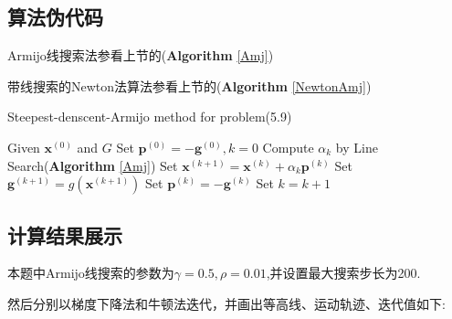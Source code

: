 \subsection{算法伪代码}
Armijo线搜索法参看上节的(\textbf{Algorithm} \ref{Amj})

带线搜索的Newton法算法参看上节的(\textbf{Algorithm} \ref{NewtonAmj})

\begin{algorithm}[h]  
\caption{Steepest-denscent-Armijo method for problem(5.9)}  
\begin{algorithmic}[1]  
\STATE Given $\bm{x}^{(0)}$ and $G$
\STATE Set $\bm{p}^{(0)}=-\bm{g}^{(0)},k=0$
\STATE Compute $\alpha_k$ by Line Search(\textbf{Algorithm} \ref{Amj})
\STATE Set $\bm{x}^{(k+1)}=\bm{x}^{(k)}+\alpha_k\bm{p}^{(k)}$
\STATE Set $\bm{g}^{(k+1)}=g(\bm{x}^{(k+1)})$
\STATE Set $\bm{p}^{(k)}=-\bm{g}^{(k)}$
\STATE Set $k=k+1$
\ENDWHILE
\end{algorithmic}  
\end{algorithm}



\subsection{计算结果展示}

本题中Armijo线搜索的参数为$\gamma=0.5,\rho=0.01$,并设置最大搜索步长为200.

然后分别以梯度下降法和牛顿法迭代，并画出等高线、运动轨迹、迭代值如下:

